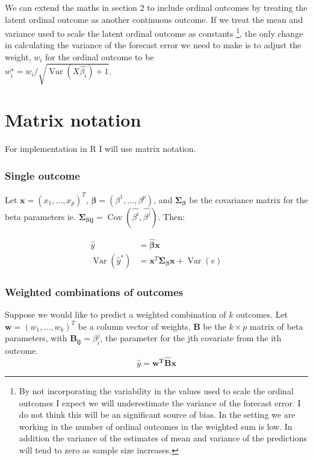\documentclass[12pt]{article}
\newcommand{\Var}{\operatorname{Var}}
\newcommand{\Cov}{\operatorname{Cov}}
\renewcommand{\vec}[1]{\mathbf{#1}}
\begin{document}
We can extend the maths in section 2 to include ordinal outcomes by treating the latent ordinal outcome as another continuous outcome. If we treat the mean and variance used to scale the latent ordinal outcome as constants \footnote{
    By not incorporating the variability in the values used to scale the ordinal outcomes I expect we will underestimate the variance of the forecast error. I do not think this will be an significant source of bias. In the setting we are working in the number of ordinal outcomes in the weighted sum is low. In addition the variance of the estimates of mean and variance of the predictions will tend to zero as sample size increases.},
 the only change in calculating the variance of the forecast error we need to make is to adjust the weight, \(w_i\) for the ordinal outcome to be \\
 \(w_i^\star = w_i /\sqrt{\Var(X\hat{\beta_i}) + 1}\). 




\section{Matrix notation}
For implementation in R I will use matrix notation.

\subsubsection{Single outcome}
Let \(\vec{x} = (x_1, ..., x_p)^T\), \(\vec{\beta} = (\beta ^1, ..., \beta ^p)\), and \(\vec{\Sigma _\beta} \) be the covariance matrix for the beta parameters ie. \(\vec{\Sigma _{\beta ij}} = \Cov(\hat{\beta^i}, \hat{\beta^j})\). Then:

\begin{align}
    \hat{y} &= \vec{\hat{\beta}} \vec{x} \\
    \Var(\hat{y}^*) &= \vec{x}^T\vec{\Sigma _\beta}\vec{x} + \Var(e)
\end{align}

\subsubsection{Weighted combinations of outcomes}
Suppose we would like to predict a weighted combination of \(k\) outcomes. Let \(\vec{w} = (w_1,...,w_k)^T\) be a column vector of weights, \(\vec{B}\) be the  \(k \times p\) matrix of beta parameters, with \(\vec{B_{ij}} = \beta_i^j\), the parameter for the jth covariate from the ith outcome.
\begin{equation}
    \hat{y} = \vec{w^T\hat{B} x}
\end{equation}
\end{document}
